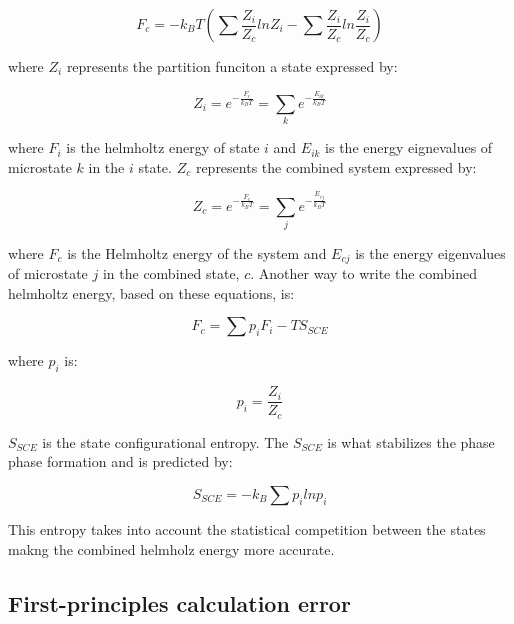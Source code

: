\begin{equation}
\label{eq: combinedhelmholtz}
F_{c} = - k_{B} T \left( \sum \frac{Z_{i}}{Z_{c}} lnZ_{i} - \sum \frac{Z_{i}}{Z_{c}} ln \frac{Z_{i}}{Z_{c}}  \right) 
\end{equation}

\noindent where $Z_{i}$ represents the partition funciton a state expressed by:

\begin{equation}
\label{eq: zi}
Z_{i} = e^{- \frac{F_{i}}{k_{B}T}} = \sum_{k} e^{- \frac{E_{ik}}{k_{B}T}}
\end{equation}

\noindent where $F_{i}$ is the helmholtz energy of state $i$ and $E_{ik}$ is the energy eignevalues of microstate $k$ in the $i$ state. $Z_{c}$ represents the combined system expressed by:

\begin{equation}
\label{eq: zc}
Z_{c} = e^{-\frac{F_{c}}{k_{B}T}} = \sum_{j} e^{- \frac{E_{cj}}{k_{B}T}} 
\end{equation}

\noindent where $F_{c}$ is the Helmholtz energy of the system and $E_{cj}$ is the energy eigenvalues of microstate $j$ in the combined state, $c$. Another way to write the combined helmholtz energy, based on these equations, is:

\begin{equation}
\label{eq: combinedhelmholtz2}
F_{c} = \sum p_{i} F_{i} - TS_{SCE}
\end{equation}

\noindent where $p_{i}$ is:

\begin{equation}
\label{pi}
p_{i} = \frac{Z_{i}}{Z_{c}}
\end{equation}

\noindent $S_{SCE}$ is the state configurational entropy. The $S_{SCE}$ is what stabilizes the phase phase formation and is predicted by:

\begin{equation}
\label{SSCE}
S_{SCE} = -k_{B} \sum p_{i} lnp_{i}
\end{equation}

\noindent This entropy takes into account the statistical competition between the states makng the combined helmholz energy more accurate. 

\subsection{First-principles calculation error}

